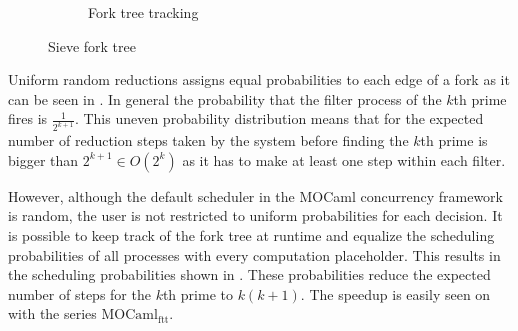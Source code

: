 \documentclass[12pt,twoside,notitlepage]{report}
\theoremstyle{plain}%
\theoremstyle{definition}
\theoremstyle{remark}
\begin{document}
\begin{figure}[H]
\begin{subfigure}[b]{0.45\linewidth}
\caption{Fork tree tracking}
\label{fig:sieve_ftt}
\end{subfigure}
%

%
%

%
\caption{Sieve fork tree}
\label{fig:sieve_fork_tree}
\end{figure}


Uniform random reductions assigns equal probabilities to each edge of a fork as it can be seen in . In general the probability that the filter process of the $ k $th prime fires is $ \frac{1}{2^{k+1}} $. This uneven probability distribution means that for the expected number of reduction steps taken by the system before finding the $ k $th prime is bigger than $ 2^{k+1} \in O(2^{k}) $ as it has to make at least one step within each filter.

However, although the default scheduler in the MOCaml concurrency framework is random, the user is not restricted to uniform probabilities for each decision. It is possible to keep track of the fork tree at runtime and equalize the scheduling probabilities of all processes with every computation placeholder. This results in the scheduling probabilities shown in . These probabilities reduce the expected number of steps for the $ k $th prime to $ k(k+1) $. The speedup is easily seen on  with the series $ \text{MOCaml}_{\text{ftt}} $.
\end{document}
